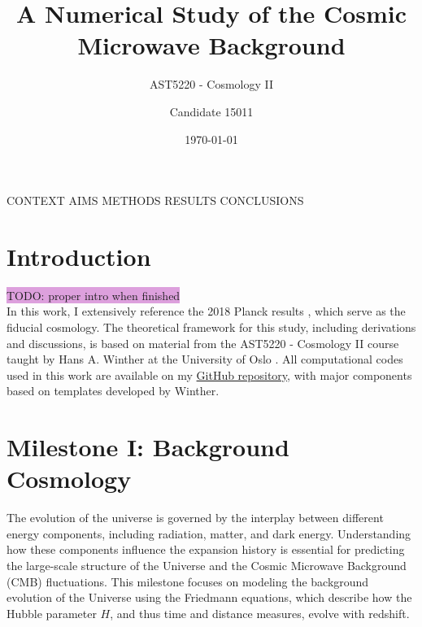\documentclass{aa}
\numberwithin{equation}{section}
\numberwithin{table}{section}
\numberwithin{figure}{section}
\begin{document}
 


   \title{A Numerical Study of the Cosmic Microwave Background}

   \subtitle{AST5220 - Cosmology II}

   \author{Candidate 15011
          }


   \date{\today}

 
  \abstract

  {CONTEXT}
  {AIMS}
  {METHODS}
  {RESULTS}
  {CONCLUSIONS}

   \maketitle
%
\section{Introduction}\label{sec: introduction}
\colorbox{Plum}{TODO: proper intro when finished} \\

In this work, I extensively reference the 2018 Planck results \citep[see][]{Planck}, which serve as the fiducial cosmology. The theoretical framework for this study, including derivations and discussions, is based on material from the AST5220 - Cosmology II course taught by Hans A. Winther at the University of Oslo \citep[see][]{Course}. All computational codes used in this work are available on my \href{https://github.com/paljettrosa/AST5220}{GitHub repository}, with major components based on templates developed by Winther. 


\section{Milestone I: Background Cosmology}\label{sec: milestone I}
The evolution of the universe is governed by the interplay between different energy components, including radiation, matter, and dark energy. Understanding how these components influence the expansion history is essential for predicting the large-scale structure of the Universe and the Cosmic Microwave Background (CMB) fluctuations. This milestone focuses on modeling the background evolution of the Universe using the Friedmann equations, which describe how the Hubble parameter $H$, and thus time and distance measures, evolve with redshift. 
\end{document}
